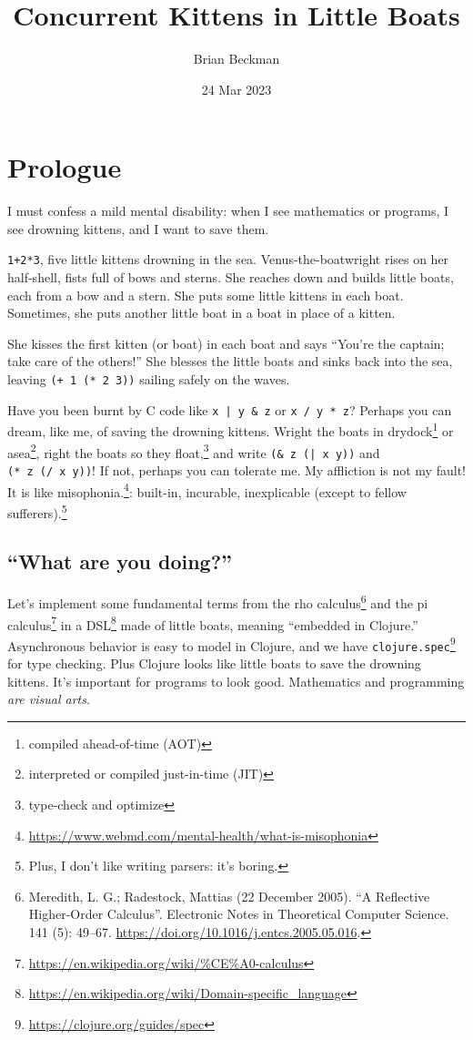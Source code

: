 \documentclass[10pt,oneside,x11names]{article}
\author{Brian Beckman}
\date{24 Mar 2023}
\title{Concurrent Kittens in Little Boats}
\theoremstyle{definition}
\theoremstyle{warning}
\begin{document}
\maketitle
\setcounter{tocdepth}{2}
\tableofcontents

\setlength\parindent{0pt}

\clearpage
\section{Prologue}
\label{sec:org8710f9e}

I must confess a mild mental disability: when I see
mathematics or programs, I see drowning kittens, and I want to save them.

\texttt{1+2*3}, five little kittens drowning in the sea.
Venus-the-boatwright rises on her half-shell, fists full of bows
and sterns. She reaches down and builds little boats, each from a
bow and a stern. She puts some little kittens in each boat.
Sometimes, she puts another little boat in a boat in place of a
kitten.

She kisses the first kitten (or boat) in each boat and says
``You're the captain; take care of the others!'' She blesses the
little boats and sinks back into the sea, leaving \texttt{(+ 1 (* 2 3))}
sailing safely on the waves.

Have you been burnt by C code like \texttt{x | y \& z} or \texttt{x / y * z}?
Perhaps you can dream, like me, of saving the drowning kittens.
Wright the boats in drydock\footnote{compiled ahead-of-time (AOT)} or
asea\footnote{interpreted or compiled just-in-time (JIT)}, right
the boats so they float,\footnote{type-check and optimize} and write
\texttt{(\& z (| x y))} and \texttt{(* z (/ x y))}! If not, perhaps you can
tolerate me. My affliction is not my fault! It is like
misophonia.\footnote{\url{https://www.webmd.com/mental-health/what-is-misophonia}}:
built-in, incurable, inexplicable (except to fellow
sufferers).\footnote{Plus, I don't like writing parsers: it's boring.}

\subsection{``What are you doing?''}
\label{sec:org766714c}

Let's implement some fundamental terms from the rho calculus\footnote{Meredith, L. G.; Radestock, Mattias (22 December 2005). ``A Reflective Higher-Order Calculus''. Electronic Notes in Theoretical Computer Science. 141 (5): 49–67. \url{https://doi.org/10.1016/j.entcs.2005.05.016}.}
and the pi calculus\footnote{\url{https://en.wikipedia.org/wiki/\%CE\%A0-calculus}\label{org84b0e5f}}
in a DSL\footnote{\url{https://en.wikipedia.org/wiki/Domain-specific\_language}}
made of little boats, meaning ``embedded in Clojure.'' Asynchronous
behavior is easy to model in Clojure, and we have
\texttt{clojure.spec}\footnote{\url{https://clojure.org/guides/spec}} for type
checking. Plus Clojure looks like little boats to save
the drowning kittens. It's important for programs to look good.
Mathematics and programming \emph{are visual arts}.
\end{document}
